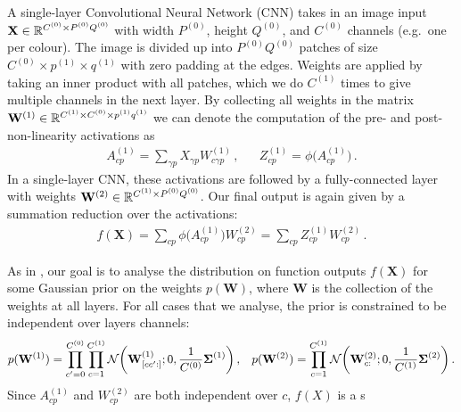\documentclass{article}
\newcommand{\vX}{\mathbf{X}}
\newcommand{\vW}{\mathbf{W}}
\begin{document}
\newcommand{\layerC}[1]{C^{(#1)}}
\newcommand{\layerw}[1]{P^{(#1)}}
\newcommand{\layerh}[1]{Q^{(#1)}}
\newcommand{\layersize}[1]{\layerw{#1}\layerh{#1}}
\newcommand{\patchw}[1]{p^{(#1)}}
\newcommand{\patchh}[1]{q^{(#1)}}
\newcommand{\W}[1]{\vW}
\newcommand{\layerWs}[1]{W^{(#1)}}
\newcommand{\layerW}[1]{\vW^{(#1)}}
\newcommand{\priorWcov}[1]{\boldsymbol{\Sigma}^{(#1)}}
\newcommand{\layerAs}[1]{A^{(#1)}}
\newcommand{\layerNLAs}[1]{Z^{(#1)}}
A single-layer Convolutional Neural Network (CNN) takes in an image input $\vX \in \Reals^{\layerC{0}\times \layersize{0}}$ with width $\layerw{0}$, height $\layerh{0}$, and $\layerC{0}$ channels (e.g.~one per colour). The image is divided up into $\layersize{0}$ patches of size $\layerC{0}\times\!\patchw{1}\times\!\patchh{1}$ with zero padding at the edges. Weights are applied by taking an inner product with all patches, which we do $\layerC{1}$ times to give multiple channels in the next layer. By collecting all weights in the matrix $\layerW{1}\in\Reals^{\layerC1\times \layerC0\times \patchw1\patchh1}$ we can denote the computation of the pre- and post-non-linearity activations as
\begin{align}
    \layerAs1_{cp} = \sum_{\gamma p} X_{\gamma p} \layerWs1_{c\gamma p} \,, && \layerNLAs1_{cp} = \phi\big(\layerAs1_{cp}\big)\,.
\end{align}
In a single-layer CNN, these activations are followed by a fully-connected layer with weights $\layerW{2} \in \Reals^{\layerC 1\times \layerw0\layerh0}$. Our final output is again given by a summation reduction over the activations:
\begin{align}
    f(\vX) = \sum_{cp} \phi\big(\layerAs1_{cp}\big) W^{(2)}_{cp} = \sum_{cp} \layerNLAs1_{cp}\layerWs2_{cp} \,.
\end{align}

As in \citet{garriga2018infiniteconv,novak2019infiniteconv}, our goal is to analyse the distribution on function outputs $f(\vX)$ for some Gaussian prior on the weights $p(\vW)$, where $\vW$ is the collection of the weights at all layers. For all cases that we analyse, the prior is constrained to be independent over layers channels:
\begin{align}
    p(\layerW1) = \prod_{c'=0}^{\layerC0}\prod_{c=1}^{\layerC1}\NormDist{\layerW1_{[cc':]}; 0, \frac{1}{\layerC0}\priorWcov1} \,,
    && p(\layerW2) = \prod_{c=1}^{\layerC1} \NormDist{\layerW2_{c:}; 0, \frac{1}{\layerC1}\priorWcov2} \,.
\end{align}
Since $\layerAs1_{cp}$ and $\layerWs2_{cp}$ are both independent over $c$, $f(X)$ is a s
\end{document}
